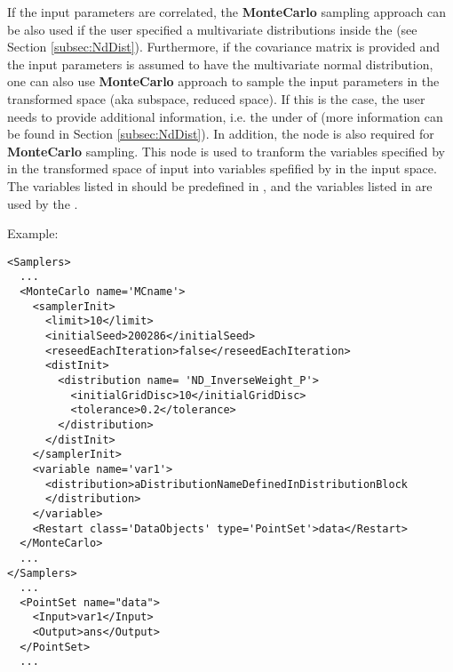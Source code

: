 If the input parameters are correlated, the \textbf{MonteCarlo} sampling approach can be also used if the user specified a
multivariate distributions inside the  (see Section \ref{subsec:NdDist}). Furthermore, if the
covariance matrix is provided and the input parameters is assumed to have the multivariate normal distribution, one can also use
\textbf{MonteCarlo} approach to sample the input parameters in the transformed space (aka subspace, reduced space). If this is
the case, the user needs to provide additional information, i.e. the  under  of
 (more information can be found in Section \ref{subsec:NdDist}). In addition, the node
 is also required for \textbf{MonteCarlo} sampling. This node is used to tranform the variables
specified by  in the transformed space of input into variables spefified by 
in the input space. The variables listed in  should be predefined in , and the variables
listed in  are used by the .


Example:
\begin{lstlisting}[style=XML]
<Samplers>
  ...
  <MonteCarlo name='MCname'>
    <samplerInit>
      <limit>10</limit>
      <initialSeed>200286</initialSeed>
      <reseedEachIteration>false</reseedEachIteration>
      <distInit>
        <distribution name= 'ND_InverseWeight_P'>
          <initialGridDisc>10</initialGridDisc>
          <tolerance>0.2</tolerance>
        </distribution>
      </distInit>
    </samplerInit>
    <variable name='var1'>
      <distribution>aDistributionNameDefinedInDistributionBlock
      </distribution>
    </variable>
    <Restart class='DataObjects' type='PointSet'>data</Restart>
  </MonteCarlo>
  ...
</Samplers>
  ...
  <PointSet name="data">
    <Input>var1</Input>
    <Output>ans</Output>
  </PointSet>
  ...
\end{lstlisting}

